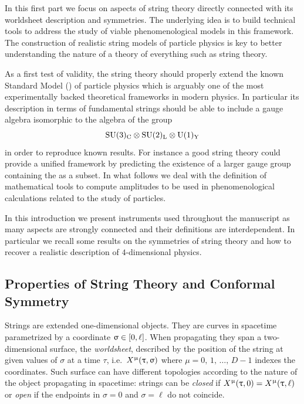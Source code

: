 In this first part we focus on aspects of string theory directly connected with its worldsheet description and symmetries.
The underlying idea is to build technical tools to address the study of viable phenomenological models in this framework.
The construction of realistic string models of particle physics is key to better understanding the nature of a theory of everything such as string theory.

As a first test of validity, the string theory should properly extend the known Standard Model (\sm) of particle physics which is arguably one of the most experimentally backed theoretical frameworks in modern physics.
In particular its description in terms of fundamental strings should be able to include a gauge algebra isomorphic to the algebra of the group
\begin{equation}
  \mathrm{SU}(3)_{\mathrm{C}} \otimes \mathrm{SU}(2)_{\mathrm{L}} \otimes \mathrm{U}(1)_{\mathrm{Y}}
  \label{eq:intro:smgroup}
\end{equation}
in order to reproduce known results.
For instance a good string theory could provide a unified framework by predicting the existence of a larger gauge group containing the \sm as a subset.
In what follows we deal with the definition of mathematical tools to compute amplitudes to be used in phenomenological calculations related to the study of particles.

In this introduction we present instruments used throughout the manuscript as many aspects are strongly connected and their definitions are interdependent.
In particular we recall some results on the symmetries of string theory and how to recover a realistic description of $4$-dimensional physics.


\subsection{Properties of String Theory and Conformal Symmetry}

Strings are extended one-dimensional objects.
They are curves in spacetime parametrized by a coordinate $\upsigma \in \qty[ 0, \ell ]$.
When propagating they span a two-dimensional surface, the \emph{worldsheet}, described by the position of the string at given values of $\sigma$ at a time $\tau$, i.e.\ $X^{\upmu}\qty(\uptau, \upsigma)$ where $\mu = 0,\, 1,\, \dots,\, D - 1$ indexes the coordinates.
Such surface can have different topologies according to the nature of the object propagating in spacetime: strings can be \emph{closed} if $X^{\upmu}\qty(\uptau, 0) = X^{\upmu}\qty(\uptau, \ell)$ or \emph{open} if the endpoints in $\sigma = 0$ and $\sigma = \ell$ do not coincide.


